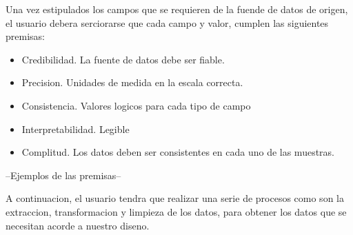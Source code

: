 
    
Una vez estipulados los campos que se requieren de la fuende de datos de origen, el usuario debera serciorarse que 
cada campo y valor, cumplen las siguientes premisas:
    \begin{itemize}
        \item Credibilidad. La fuente de datos debe ser fiable. 
        \item Precision. Unidades de medida en la escala correcta.
        \item Consistencia. Valores logicos para cada tipo de campo
        \item Interpretabilidad. Legible
        \item Complitud. Los datos deben ser consistentes en cada uno de las muestras.
    \end{itemize}
    --Ejemplos de las premisas--
    
A continuacion, el usuario tendra que realizar una serie de procesos como son  la extraccion, transformacion y 
limpieza de los datos, para obtener los datos que se necesitan acorde a nuestro diseno.
    
